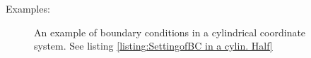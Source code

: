 \begin{FontDescr}{Examples:}
\begin{itemize}
\begin{figure}[H]
	  \qquad
				    \caption[ Setting  boundary conditions in a cylindrical coordinate system]{An example of boundary conditions in a cylindrical coordinate system. See listing \ref{listing:SettingofBC in a cylin. Half}}
				    \label{fig:Ex. SetBoundaryCond in cylin. Half}
			      \end{figure}
	  \end{itemize}
	\end{FontDescr}

